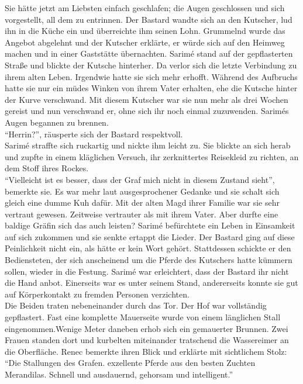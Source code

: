Sie hätte jetzt am Liebsten einfach geschlafen; die Augen geschlossen und sich vorgestellt, all dem 
zu entrinnen. Der Bastard wandte sich an den Kutscher, lud ihn in die Küche ein und überreichte ihm 
seinen Lohn. Grummelnd wurde das Angebot abgelehnt und der Kutscher erklärte, er würde sich auf den 
Heimweg machen und in einer Gaststätte übernachten. Sarimé stand auf der gepflasterten Straße und 
blickte der Kutsche hinterher. Da verlor sich die letzte Verbindung zu ihrem alten Leben. Irgendwie 
hatte sie sich mehr erhofft. Während des Aufbruchs hatte sie nur ein müdes Winken von ihrem Vater 
erhalten, ehe die Kutsche hinter der Kurve verschwand. Mit diesem Kutscher war sie nun mehr als 
drei Wochen gereist und nun verschwand er, ohne sich ihr noch einmal zuzuwenden. Sarimés Augen 
begannen zu brennen.\\
``Herrin?'', räusperte sich der Bastard respektvoll. \\
Sarimé straffte sich ruckartig und nickte ihm leicht zu. Sie blickte an sich herab und zupfte in 
einem kläglichen Versuch, ihr zerknittertes Reisekleid zu richten, an dem Stoff ihres Rockes. \\
``Vielleicht ist es besser, dass der Graf mich nicht in diesem Zustand sieht'', bemerkte sie. Es 
war mehr laut ausgesprochener Gedanke und sie schalt sich gleich eine dumme Kuh dafür. Mit der 
alten Magd ihrer Familie war sie sehr vertraut gewesen. Zeitweise vertrauter als mit ihrem Vater. 
Aber durfte eine baldige Gräfin sich das auch leisten? Sarimé befürchtete ein Leben in Einsamkeit 
auf sich zukommen und sie senkte ertappt die Lieder. Der Bastard ging auf diese Peinlichkeit nicht 
ein, als hätte er kein Wort gehört. Stattdessen schickte er den Bediensteten, der sich anscheinend 
um die Pferde des Kutschers hatte kümmern sollen, wieder in die Festung. Sarimé war erleichtert, 
dass der Bastard ihr nicht die Hand anbot. Einerseits war es unter seinem Stand, andererseits konnte 
sie gut auf Körperkontakt zu fremden Personen verzichten.\\
Die Beiden traten nebeneinander durch das Tor. Der Hof war vollständig gepflastert. Fast eine 
komplette Mauerseite wurde von einem länglichen Stall eingenommen.Wenige Meter daneben erhob sich 
ein gemauerter Brunnen. Zwei Frauen standen dort und kurbelten miteinander tratschend die 
Wassereimer an die Oberfläche. Renec bemerkte ihren Blick und erklärte mit sichtlichem Stolz: ``Die 
Stallungen des Grafen. exzellente Pferde aus den besten Zuchten Merandilas. Schnell und 
ausdauernd, gehorsam und intelligent.''\\
